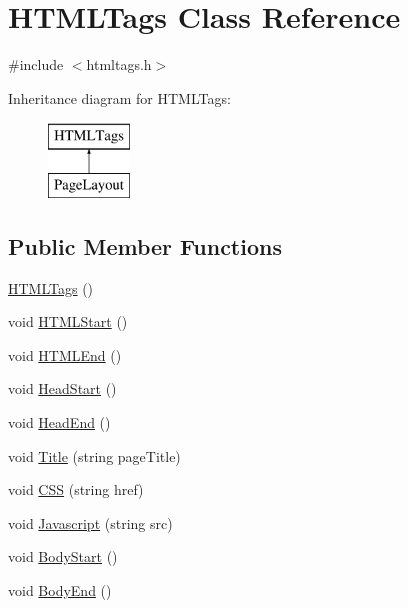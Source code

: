 \hypertarget{classHTMLTags}{\section{H\-T\-M\-L\-Tags Class Reference}
\label{d4/d7c/classHTMLTags}
}


{\ttfamily \#include $<$htmltags.\-h$>$}

Inheritance diagram for H\-T\-M\-L\-Tags\-:\begin{figure}[H]
\begin{center}
\leavevmode
\includegraphics[height=2.000000cm]{d4/d7c/classHTMLTags}
\end{center}
\end{figure}
\subsection*{Public Member Functions}
\begin{DoxyCompactItemize}
\item 
\hyperlink{classHTMLTags_a4f0bb4f538b87033b574ff05798eb60b_a4f0bb4f538b87033b574ff05798eb60b}{H\-T\-M\-L\-Tags} ()
\item 
void \hyperlink{classHTMLTags_a567551cd701d2836d4240b2917b5e13f_a567551cd701d2836d4240b2917b5e13f}{H\-T\-M\-L\-Start} ()
\item 
void \hyperlink{classHTMLTags_a6553c3d01ee194a1d157e6341333dee3_a6553c3d01ee194a1d157e6341333dee3}{H\-T\-M\-L\-End} ()
\item 
void \hyperlink{classHTMLTags_af2b01cc08884af52e0b291d07035062e_af2b01cc08884af52e0b291d07035062e}{Head\-Start} ()
\item 
void \hyperlink{classHTMLTags_afdc779e46fac16cc79e4f0e87f621254_afdc779e46fac16cc79e4f0e87f621254}{Head\-End} ()
\item 
void \hyperlink{classHTMLTags_a5128d6f1c6be5ac1689047fc9d0d159f_a5128d6f1c6be5ac1689047fc9d0d159f}{Title} (string page\-Title)
\item 
void \hyperlink{classHTMLTags_a4e9e18580cc7f2b82c82e4f81e39be50_a4e9e18580cc7f2b82c82e4f81e39be50}{C\-S\-S} (string href)
\item 
void \hyperlink{classHTMLTags_aea041d720f12a210615c95350774e6aa_aea041d720f12a210615c95350774e6aa}{Javascript} (string src)
\item 
void \hyperlink{classHTMLTags_af1fb7b90b9ebb83177da18aba1ef86a9_af1fb7b90b9ebb83177da18aba1ef86a9}{Body\-Start} ()
\item 
void \hyperlink{classHTMLTags_a7cae36bd3a0e6f35e89494e5cda64971_a7cae36bd3a0e6f35e89494e5cda64971}{Body\-End} ()
\end{DoxyCompactItemize}


